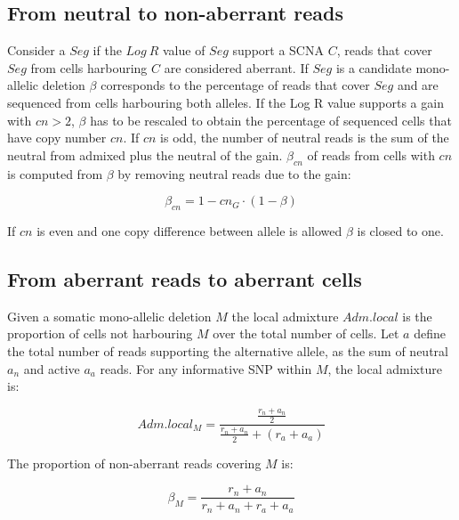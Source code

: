 	\subsection{From neutral to non-aberrant reads}
	Consider a $Seg$ if the $Log\ R$ value of $Seg$ support a SCNA $C$, reads that cover $Seg$ from cells harbouring $C$ are considered aberrant.
	If $Seg$ is a candidate mono-allelic deletion $\beta$ corresponds to the percentage of reads that cover $Seg$ and are sequenced from cells harbouring both alleles.
	If the Log R value supports a gain with $cn >2$, $\beta$ has to be rescaled to obtain the percentage of sequenced cells that have copy number $cn$.
	If $cn$ is odd, the number of neutral reads is the sum of the neutral from admixed plus the neutral of the gain.
	$\beta_{cn}$ of reads from cells with $cn$ is computed from $\beta$ by removing neutral reads due to the gain:

	$$\beta_{cn} = 1 - cn_{G}\cdot (1-\beta)$$

	If $cn$ is even and one copy difference between allele is allowed $\beta$ is closed to one.

	\subsection{From aberrant reads to aberrant cells}
	Given a somatic mono-allelic deletion $M$ the local admixture $Adm.local$ is the proportion of cells not harbouring $M$ over the total number of cells.
	Let $a$ define the total number of reads supporting the alternative allele, as the sum of neutral $a_n$ and active $a_a$ reads.
	For any informative SNP within $M$, the local admixture is:

	$$Adm.local_M = \frac{\frac{r_n+a_n}{2}}{\frac{r_n+a_n}{2}+(r_a+a_a)}$$

	The proportion of non-aberrant reads covering $M$ is:

	$$\beta_M = \frac{r_n+a_n}{r_n+a_n+r_a+a_a}$$

